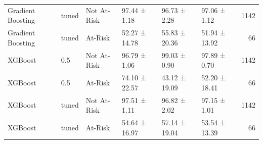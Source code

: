 \begin{table}
\begin{tabular}{llllllr}
Gradient Boosting & tuned & Not At-Risk & 97.44 ± 1.18 & 96.73 ± 2.28 & 97.06 ± 1.12 & 1142 \\
Gradient Boosting & tuned & At-Risk & 52.27 ± 14.78 & 55.83 ± 20.36 & 51.94 ± 13.92 & 66 \\
XGBoost & 0.5 & Not At-Risk & 96.79 ± 1.06 & 99.03 ± 0.90 & 97.89 ± 0.70 & 1142 \\
XGBoost & 0.5 & At-Risk & 74.10 ± 22.57 & 43.12 ± 19.09 & 52.20 ± 18.41 & 66 \\
XGBoost & tuned & Not At-Risk & 97.51 ± 1.11 & 96.82 ± 2.02 & 97.15 ± 1.01 & 1142 \\
XGBoost & tuned & At-Risk & 54.64 ± 16.97 & 57.14 ± 19.04 & 53.54 ± 13.39 & 66 \\
\bottomrule
\end{tabular}
\end{table}
